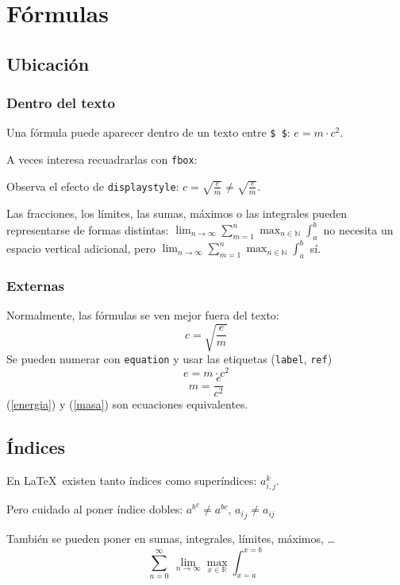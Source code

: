 \documentclass[12pt]{article}
\begin{document}
	\section{Fórmulas}
	\subsection{Ubicación}
	\subsubsection{Dentro del texto}
	Una fórmula puede aparecer dentro de un texto entre \texttt{\$ \$}: $e=m\cdot c^2$. 
	\par\bigskip\noindent
	A veces interesa recuadrarlas con \texttt{fbox}: 
	\par\bigskip\noindent
	Observa el efecto de \texttt{displaystyle}: $c=\sqrt{\frac{e}{m}} \neq \sqrt{\displaystyle\frac{e}{m}}$. 
	\par\bigskip\noindent
	Las fracciones, los límites, las sumas, máximos o las integrales pueden representarse de formas distintas: $\lim_{n\to\infty}\sum_{m=1}^n\max_{n \in \mathbb{N}}\int_a^b$ no necesita un espacio vertical adicional, pero $\displaystyle\lim_{n\to\infty}\sum_{m=1}^n\max_{n \in \mathbb{N}}\int_a^b$ sí.
	\subsubsection{Externas}
	Normalmente, las fórmulas se ven mejor fuera del texto:
	\[
	c=\sqrt{\displaystyle\frac{e}{m}}
	\]
	Se pueden numerar con \texttt{equation} y usar las etiquetas (\texttt{label}, \texttt{ref})
	\begin{equation}\label{energia}
	e=m \cdot c^2
	\end{equation}
	\begin{equation}\label{masa}
	m=\displaystyle\frac{e}{c^2}
	\end{equation}
	(\ref{energia}) y (\ref{masa}) son ecuaciones equivalentes.
	\subsection{Índices}
	En \LaTeX\ existen tanto índices como superíndices: $a_{i,j}^k$. 
	\par\bigskip\noindent
	Pero cuidado al poner índice dobles: ${a^b}^c \neq a^{bc}$, ${a_i}_j \neq a_{ij}$
	\par\bigskip\noindent
	También se pueden poner en sumas, integrales, límites, máximos, \ldots
	\[
	\sum_{n=0}^{\infty} \ \lim_{n \to \infty} \max_{x \in \mathbb{R}} \int_{x=a}^{x=b}
	\]
\end{document}
